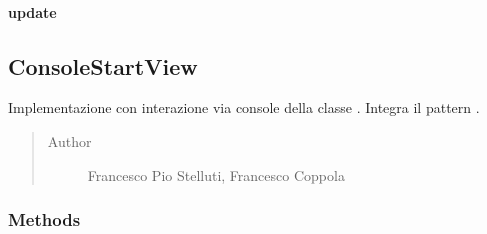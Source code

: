 \documentclass[letterpaper,10pt,italian,openany,oneside]{sphinxmanual}
\begin{document}
\paragraph{update}
\label{\detokenize{source/it/unicam/cs/pa/mastermind/ui/ConsoleGameView:update}}

\begin{fulllineitems}
\label{\detokenize{source/it/unicam/cs/pa/mastermind/ui/ConsoleGameView:it.unicam.cs.pa.mastermind.ui.ConsoleGameView.update()}}
\end{fulllineitems}



\subsection{ConsoleStartView}
\label{\detokenize{source/it/unicam/cs/pa/mastermind/ui/ConsoleStartView:consolestartview}}\label{\detokenize{source/it/unicam/cs/pa/mastermind/ui/ConsoleStartView::doc}}

\begin{fulllineitems}
\label{\detokenize{source/it/unicam/cs/pa/mastermind/ui/ConsoleStartView:it.unicam.cs.pa.mastermind.ui.ConsoleStartView}}
Implementazione con interazione via console della classe . Integra il pattern .
\begin{quote}\begin{description}
\item[{Author}] \leavevmode
Francesco Pio Stelluti, Francesco Coppola

\end{description}\end{quote}

\end{fulllineitems}



\subsubsection{Methods}
\label{\detokenize{source/it/unicam/cs/pa/mastermind/ui/ConsoleStartView:methods}}
\end{document}
